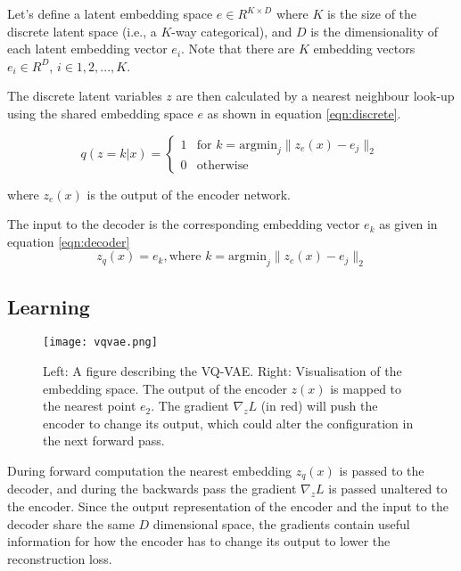 Let's define a latent embedding space $e \in R^{K \times D}$ where $K$ is the size of the discrete latent space 
(i.e., a $K$-way categorical), and $D$ is the dimensionality of each latent embedding vector $e_{i}$.
Note that there are $K$ embedding vectors $e_{i} \in R ^D$, $i\in{1, 2, ..., K}$.

The discrete latent variables $z$ are then calculated by a nearest 
neighbour look-up using the shared embedding space $e$ as shown in equation \ref{eqn:discrete}.

\begin{equation}
q(z = k|x) =
\begin{cases}
    1 & \text{for } k = \text{argmin}_{j} \| z_{e}(x) - e_{j} \|_{2} \\
    0 & \text{otherwise}
\end{cases}
\label{eqn:discrete}
\end{equation} 

where $z _e(x)$ is the output of the encoder network.

The input to the decoder is the corresponding embedding vector $e _k$ as given in equation \ref{eqn:decoder}
\begin{equation}
    z _q(x) = e _k, \text{where } k= \text{argmin} _j \| z _e(x) - e _j \| _2
    \label{eqn:decoder}
\end{equation}

\subsection{Learning}

\begin{figure}[h]
    \begin{center}
        \texttt{[image: vqvae.png]}
    \end{center}
    \caption{Left: A figure describing the VQ-VAE. Right: Visualisation of the embedding space. The
    output of the encoder $z(x)$ is mapped to the nearest point $e _2$. The gradient $\nabla _z L$ (in red) will push the
    encoder to change its output, which could alter the configuration in the next forward pass.}
    \label{fig:vqvae}
\end{figure}

During forward computation the nearest embedding $z _q(x)$ is passed to the decoder,
and during the backwards pass the gradient $\nabla _z L$ is passed unaltered to the encoder. 
Since the output representation of the encoder and the input to the decoder share the same $D$
dimensional space, the gradients contain useful information for how the encoder has to change its 
output to lower the reconstruction loss.

